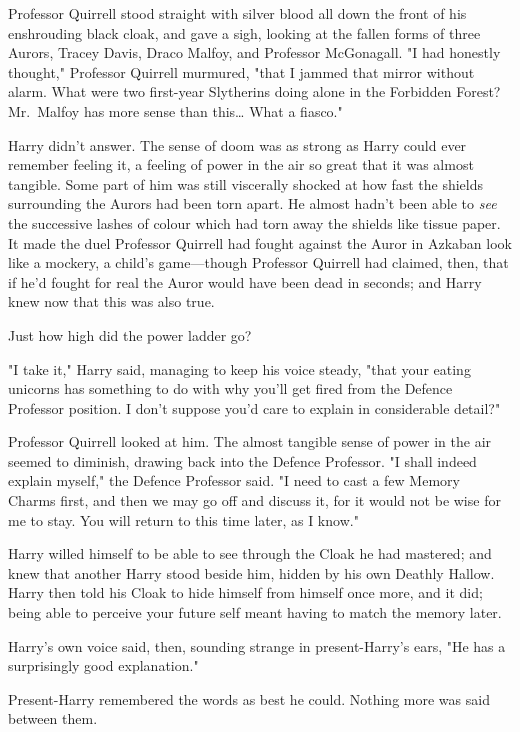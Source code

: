 Professor Quirrell stood straight with silver blood all down the front of his
enshrouding black cloak, and gave a sigh, looking at the fallen forms of three
Aurors, Tracey Davis, Draco Malfoy, and Professor McGonagall. "I had honestly
thought," Professor Quirrell murmured, "that I jammed that mirror without
alarm. What were two first-year Slytherins doing alone in the Forbidden Forest?
Mr.~Malfoy has more sense than this{\ldots} What a fiasco."

Harry didn't answer. The sense of doom was as strong as Harry could ever
remember feeling it, a feeling of power in the air so great that it was almost
tangible. Some part of him was still viscerally shocked at how fast the shields
surrounding the Aurors had been torn apart. He almost hadn't been able to
\emph{see} the successive lashes of colour which had torn away the shields like
tissue paper. It made the duel Professor Quirrell had fought against the Auror
in Azkaban look like a mockery, a child's game---though Professor Quirrell had
claimed, then, that if he'd fought for real the Auror would have been dead in
seconds; and Harry knew now that this was also true.

Just how high did the power ladder go?

"I take it," Harry said, managing to keep his voice steady, "that your eating
unicorns has something to do with why you'll get fired from the Defence
Professor position. I don't suppose you'd care to explain in considerable
detail?"

Professor Quirrell looked at him. The almost tangible sense of power in the air
seemed to diminish, drawing back into the Defence Professor. "I shall indeed
explain myself," the Defence Professor said. "I need to cast a few Memory
Charms first, and then we may go off and discuss it, for it would not be wise
for me to stay. You will return to this time later, as I know."

Harry willed himself to be able to see through the Cloak he had mastered; and
knew that another Harry stood beside him, hidden by his own Deathly Hallow.
Harry then told his Cloak to hide himself from himself once more, and it did;
being able to perceive your future self meant having to match the memory later.

Harry's own voice said, then, sounding strange in present-Harry's ears, "He has
a surprisingly good explanation."

Present-Harry remembered the words as best he could. Nothing more was said
between them.


